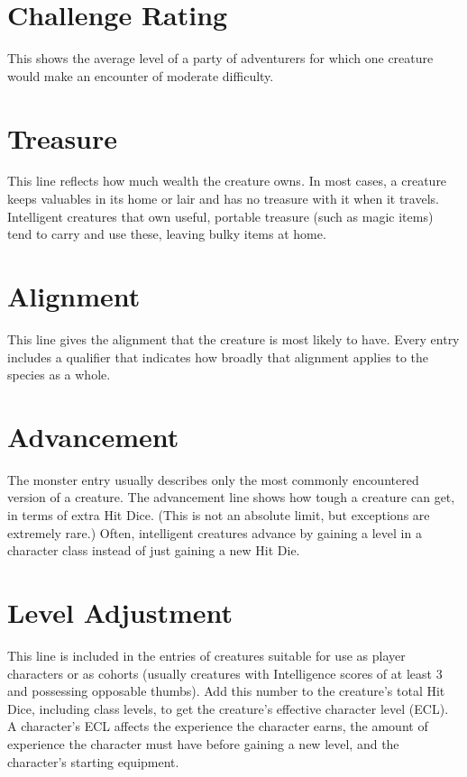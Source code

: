 \documentclass{article}
\begin{document}
\section*{\textbf{Challenge Rating}}

This shows the average level of a party of adventurers for which one creature would 
make an encounter of moderate difficulty.

\section*{\textbf{Treasure}}

This line reflects how much wealth the creature owns\textit{. }In most cases, a 
creature keeps valuables in its home or lair and has no treasure with it when it 
travels. Intelligent creatures that own useful, portable treasure (such as magic 
items) tend to carry and use these, leaving bulky items at home.

\section*{\textbf{Alignment}}

This line gives the alignment that the creature is most likely to have. Every entry 
includes a qualifier that indicates how broadly that alignment applies to the species 
as a whole.

\section*{\textbf{Advancement}}

The monster entry usually describes only the most commonly encountered version 
of a creature. The advancement line shows how tough a creature can get, in terms 
of extra Hit Dice. (This is not an absolute limit, but exceptions are extremely 
rare.) Often, intelligent creatures advance by gaining a level in a character class 
instead of just gaining a new Hit Die.

\section*{\textbf{Level Adjustment}}

This line is included in the entries of creatures suitable for use as player characters 
or as cohorts (usually creatures with Intelligence scores of at least 3 and possessing 
opposable thumbs). Add this number to the creature's total Hit Dice, including 
class levels, to get the creature's effective character level (ECL). A character's 
ECL affects the experience the character earns, the amount of experience the character 
must have before gaining a new level, and the character's starting equipment.
\end{document}
